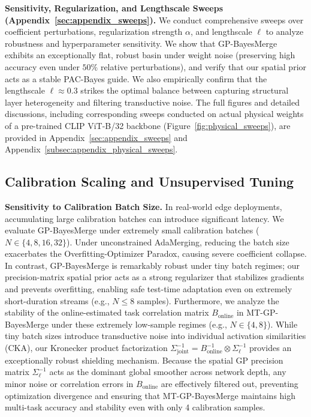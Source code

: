 \textbf{Sensitivity, Regularization, and Lengthscale Sweeps
(Appendix~\ref{sec:appendix_sweeps}).} We conduct comprehensive sweeps over
coefficient perturbations, regularization strength $\alpha$, and lengthscale
$\ell$ to analyze robustness and hyperparameter sensitivity. We show that
GP-BayesMerge exhibits an exceptionally flat, robust basin under weight noise
(preserving high accuracy even under $50\%$ relative perturbations), and verify
that our spatial prior acts as a stable PAC-Bayes guide. We also empirically
confirm that the lengthscale $\ell \approx 0.3$ strikes the optimal balance
between capturing structural layer heterogeneity and filtering transductive
noise. The full figures and detailed discussions, including corresponding sweeps conducted
on actual physical weights of a pre-trained CLIP ViT-B/32 backbone (Figure~\ref{fig:physical_sweeps}),
are provided in Appendix~\ref{sec:appendix_sweeps} and Appendix~\ref{subsec:appendix_physical_sweeps}.

\subsection{Calibration Scaling and Unsupervised Tuning}
\label{subsec:scaling_tuning}

\textbf{Sensitivity to Calibration Batch Size.} In real-world edge deployments,
accumulating large calibration batches can introduce significant latency. We
evaluate GP-BayesMerge under extremely small calibration batches ($N \in \{4, 8,
16, 32\}$). Under unconstrained AdaMerging, reducing the batch size exacerbates
the Overfitting-Optimizer Paradox, causing severe coefficient collapse. In
contrast, GP-BayesMerge is remarkably robust under tiny batch regimes; our
precision-matrix spatial prior acts as a strong regularizer that stabilizes
gradients and prevents overfitting, enabling safe test-time adaptation even on
extremely short-duration streams (e.g., $N \le 8$ samples). Furthermore, we
analyze the stability of the online-estimated task correlation matrix
$B_{\text{online}}$ in MT-GP-BayesMerge under these extremely low-sample regimes
(e.g., $N \in \{4, 8\}$). While tiny batch sizes introduce transductive noise
into individual activation similarities (CKA), our Kronecker product
factorization $\Sigma_{\text{joint}}^{-1} = B_{\text{online}}^{-1} \otimes
\Sigma_{\ell}^{-1}$ provides an exceptionally robust shielding mechanism.
Because the spatial GP precision matrix $\Sigma_{\ell}^{-1}$ acts as the
dominant global smoother across network depth, any minor noise or correlation
errors in $B_{\text{online}}$ are effectively filtered out, preventing
optimization divergence and ensuring that MT-GP-BayesMerge maintains high
multi-task accuracy and stability even with only 4 calibration samples.

